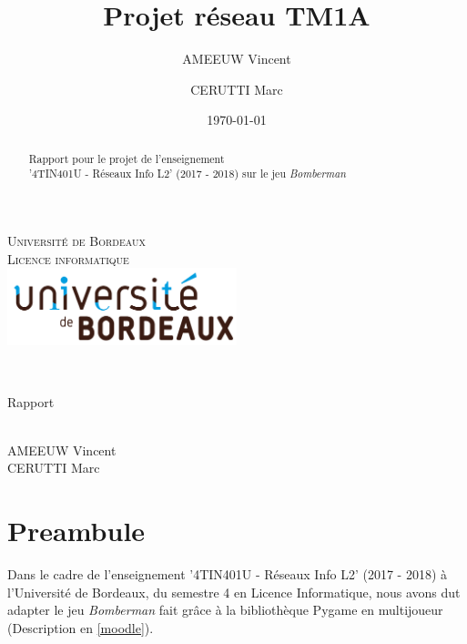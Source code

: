 \documentclass[a4paper]{article}
\title{Projet réseau  TM1A}
\author{AMEEUW Vincent\and CERUTTI Marc}
\date{\today}
\begin{document}
\makeatletter
  \begin{titlepage}
  \centering
      {\large \textsc{Université de Bordeaux}}\\
      \textsc{Licence informatique}\\
    \vspace{1cm}
      \includegraphics[width=0.5\textwidth]{IMG_Latex/ubx-logo.png}\\
	\vspace{2cm}
       
\begin{center}
	{\large\textbf{	\@date}}\\
	\vspace{15mm}
	
    {\Huge   Rapport\\
    \vspace{5mm}
    \textbf{\@title}\\}
    
    \vspace{15mm}
    {\large AMEEUW Vincent \\ CERUTTI Marc} \\
    
    \vspace{15mm}
	\begin{abstract}
	\center
	Rapport pour le projet de l'enseignement \\'4TIN401U - Réseaux Info L2' (2017 - 2018) sur le jeu \textit{Bomberman}\\
	\end{abstract}
\end{center}
       
	
  \end{titlepage}
\makeatother


\cleardoublepage
\tableofcontents

\newpage

\part{Preambule}

Dans le cadre de l'enseignement '4TIN401U - Réseaux Info L2' (2017 - 2018) à l'Université de Bordeaux, du semestre 4 en Licence Informatique, nous avons dut adapter le jeu \textit{Bomberman} fait grâce à la bibliothèque Pygame en multijoueur (Description en \ref{moodle}).
\\
\end{document}
